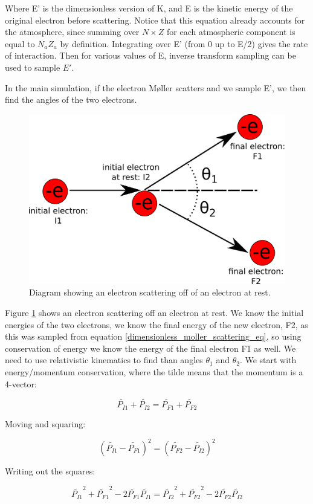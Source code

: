 \documentclass[]{article}
\begin{document}
Where E' is the dimensionless version of K, and E is the kinetic energy of the original electron before scattering. Notice that this equation already accounts for the atmosphere, since summing over $N\times Z$ for each atmospheric component is equal to $N_a Z_a$ by definition.  Integrating over E' (from 0 up to E/2) gives the rate of interaction. Then for various values of E, inverse transform sampling can be used to sample $E'$. 

In the main simulation, if the electron M\o ller scatters and we sample E', we then find the angles of the two electrons.

\begin{figure}
\centering
\includegraphics[width=0.7\linewidth]{./figures/moller_kinematics/scattering_kinematics}
\caption{Diagram showing an electron scattering off of an electron at rest.}
\label{scattering_kin_fig}
\end{figure}

Figure \ref{scattering_kin_fig} shows an electron scattering off an electron at rest. We know the initial energies of the two electrons, we know the final energy of the new electron, F2, as this was sampled from equation \ref{dimensionless_moller_scattering_eq}, so using conservation of energy we know the energy of the final electron F1 as well. We need to use relativistic kinematics to find than angles $\theta_1$ and $\theta_2$. We start with energy/momentum conservation, where the tilde means that the momentum is a 4-vector:

\[ 
\tilde{P_{I1}}+\tilde{P_{I2}}=\tilde{P_{F1}}+\tilde{P_{F2}}
\]

Moving and squaring:

\[ 
(\tilde{P_{I1}}-\tilde{P_{F1}})^2=(\tilde{P_{F2}}-\tilde{P_{I2}})^2
\]

Writing out the squares:

\[ 
\tilde{P_{I1}}^2 + \tilde{P_{F1}}^2 - 2\tilde{P_{F1}}\tilde{P_{I1}}=\tilde{P_{I2}}^2 + \tilde{P_{F2}}^2 - 2\tilde{P_{F2}}\tilde{P_{I2}}
\]
\end{document}
